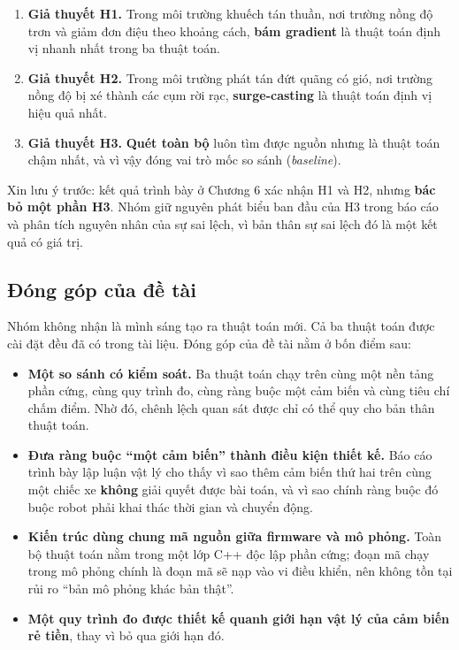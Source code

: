 \begin{enumerate}[leftmargin=1.6em,itemsep=0.15em,topsep=0.3em]
  \item \textbf{Giả thuyết H1.} Trong môi trường khuếch tán thuần, nơi trường nồng độ trơn và giảm đơn điệu theo khoảng cách, \textbf{bám gradient} là thuật toán định vị nhanh nhất trong ba thuật toán.
  \item \textbf{Giả thuyết H2.} Trong môi trường phát tán đứt quãng có gió, nơi trường nồng độ bị xé thành các cụm rời rạc, \textbf{surge-casting} là thuật toán định vị hiệu quả nhất.
  \item \textbf{Giả thuyết H3.} \textbf{Quét toàn bộ} luôn tìm được nguồn nhưng là thuật toán chậm nhất, và vì vậy đóng vai trò mốc so sánh (\textit{baseline}).
\end{enumerate}
Xin lưu ý trước: kết quả trình bày ở Chương 6 xác nhận H1 và H2, nhưng \textbf{bác bỏ một phần H3}. Nhóm giữ nguyên phát biểu ban đầu của H3 trong báo cáo và phân tích nguyên nhân của sự sai lệch, vì bản thân sự sai lệch đó là một kết quả có giá trị.


\subsection{Đóng góp của đề tài}
Nhóm không nhận là mình sáng tạo ra thuật toán mới. Cả ba thuật toán được cài đặt đều đã có trong tài liệu. Đóng góp của đề tài nằm ở bốn điểm sau:

\begin{itemize}[leftmargin=1.4em,itemsep=0.15em,topsep=0.3em]
  \item \textbf{Một so sánh có kiểm soát.} Ba thuật toán chạy trên cùng một nền tảng phần cứng, cùng quy trình đo, cùng ràng buộc một cảm biến và cùng tiêu chí chấm điểm. Nhờ đó, chênh lệch quan sát được chỉ có thể quy cho bản thân thuật toán.
  \item \textbf{Đưa ràng buộc ``một cảm biến'' thành điều kiện thiết kế.} Báo cáo trình bày lập luận vật lý cho thấy vì sao thêm cảm biến thứ hai trên cùng một chiếc xe \textbf{không} giải quyết được bài toán, và vì sao chính ràng buộc đó buộc robot phải khai thác thời gian và chuyển động.
  \item \textbf{Kiến trúc dùng chung mã nguồn giữa firmware và mô phỏng.} Toàn bộ thuật toán nằm trong một lớp C++ độc lập phần cứng; đoạn mã chạy trong mô phỏng chính là đoạn mã sẽ nạp vào vi điều khiển, nên không tồn tại rủi ro ``bản mô phỏng khác bản thật''.
  \item \textbf{Một quy trình đo được thiết kế quanh giới hạn vật lý của cảm biến rẻ tiền}, thay vì bỏ qua giới hạn đó.
\end{itemize}

